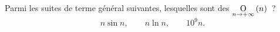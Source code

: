\documentclass{magnoliaold}
\begin{document}
\begin{exoUnique}
\exo Parmi les suites de terme général suivantes, lesquelles sont des $\underset{n \rightarrow +\infty}{\text{O}}\left(n\right)$~?
\[n\sin n,\qquad n\ln n, \qquad 10^9 n.\]
\end{exoUnique}



\end{document}
